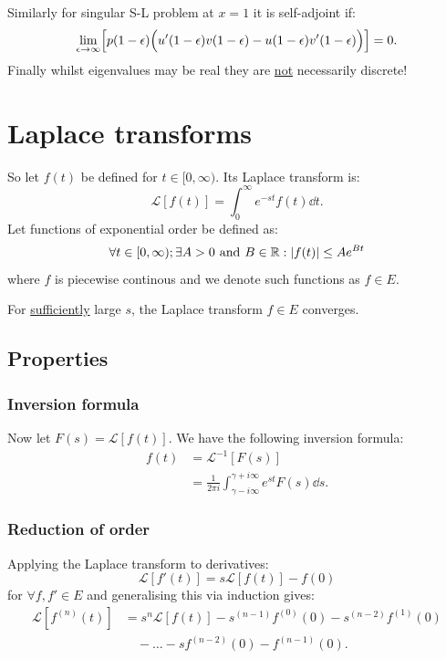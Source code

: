 \documentclass{article}
\begin{document}
Similarly for singular S-L problem at $x=1$ it is self-adjoint if:
$$\lim_{\epsilon\rightarrow\infty}
\Bigl[p(1-\epsilon)
\Bigl(u'(1-\epsilon)v(1-\epsilon)-u(1-\epsilon)v'(1-\epsilon)\Bigr)\Bigr]=0.$$
Finally whilst eigenvalues may be real they are \underline{not}
necessarily discrete!

\newpage

\section{Laplace transforms}
So let $f(t)$ be defined for $t\in[0,\infty)$. Its Laplace transform is:
$$\mathcal{L}[f(t)]=\int_{0}^{\infty}e^{-st}f(t)\dd t.$$
Let functions of exponential order be defined as:
$$\forall t\in[0,\infty);\exists A>0\hspace{0.05in}\text{and}\hspace{0.05in}
B\in\mathbb{R}:|f(t)|\leq Ae^{Bt}$$
where $f$ is piecewise continous and
we denote such functions as $f\in E$.

For \underline{sufficiently} large $s$, the Laplace transform
$f\in E$ converges.

\subsection{Properties}
\subsubsection{Inversion formula}
Now let $F(s)=\mathcal{L}[f(t)]$. We have
the following inversion formula:
\begin{align*}
    f(t)
    &=\mathcal{L}^{-1}[F(s)] \\
    &=\frac{1}{2\pi i}\int_{\gamma-i\infty}^
    {\gamma+i\infty}e^{st}F(s)\dd s.
\end{align*}

\subsubsection{Reduction of order}
Applying the Laplace transform to derivatives:
$$\mathcal{L}[f'(t)]=s\mathcal{L}[f(t)]-f(0)$$
for $\forall f,f'\in E$ and 
generalising this via induction gives:
\begin{align*}
    \mathcal{L}[f^{(n)}(t)]
    &=s^n\mathcal{L}[f(t)]
    -s^{(n-1)}f^{(0)}(0)-s^{(n-2)}f^{(1)}(0) \\
    &\quad-\dots-sf^{(n-2)}(0)-f^{(n-1)}(0).
\end{align*}
\end{document}
